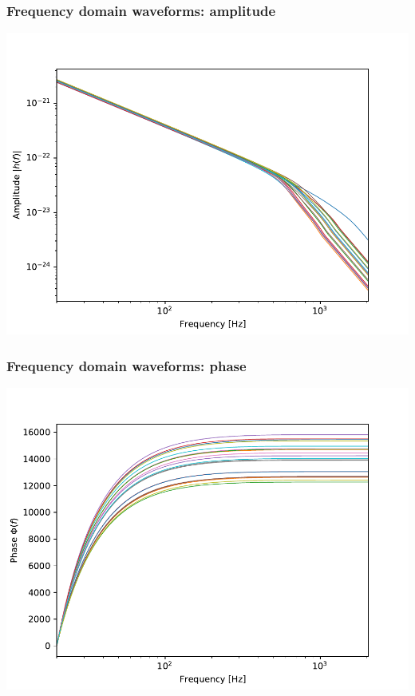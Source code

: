 \documentclass{beamer}
\begin{document}
\begin{frame}
    \frametitle{Frequency domain waveforms: amplitude}

    \centering
    \includegraphics[width=.9\textwidth]{figures/amplitude_random.pdf}
\end{frame}

\begin{frame}
    \frametitle{Frequency domain waveforms: phase}

    \centering
    \includegraphics[width=.9\textwidth]{figures/phase_random_semilog.pdf}
\end{frame}
\end{document}
